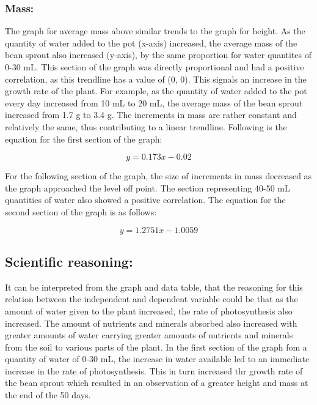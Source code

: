 \documentclass[11pt, a4]{article}
\begin{document}
			\subsubsection{Mass:}
				The graph for average mass above similar trends to the graph for height. As the quantity of water added to the pot (x-axis) increased, the average mass of the bean sprout also increased (y-axis), by the same proportion for water quantites of 0-30 mL. This section of the graph was directly proportional and had a positive correlation, as this trendline has a value of (0, 0). This signals an increase in the growth rate of the plant. For example, as the quantity of water added to the pot every day increased from 10 mL to 20 mL, the average mass of the bean sprout increased from 1.7 g to 3.4 g. The increments in mass are rather constant and relatively the same, thus contributing to a linear trendline. Following is the equation for the first section of the graph:
				
				\begin{equation}
					y = 0.173x - 0.02	
				\end{equation}
				
				For the following section of the graph, the size of increments in mass decreased as the graph approached the level off point. The section representing 40-50 mL quantities of water also showed a positive correlation. The equation for the second section of the graph is as follows:

				\begin{equation}
					y = 1.2751x - 1.0059
				\end{equation}

		\subsection{Scientific reasoning:}
			It can be interpreted from the graph and data table, that the reasoning for this relation between the independent and dependent variable could be that as the amount of water given to the plant increased, the rate of photosynthesis also increased. The amount of nutrients and minerals absorbed also increased with greater amounts of water carrying greater amounts of nutrients and minerals from the soil to various parts of the plant. In the first section of the graph fom a quantity of water of 0-30 mL, the increase in water available led to an immediate increase in the rate of photosynthesis. This in turn increased thr growth rate of the bean sprout which resulted in an observation of a greater height and mass at the end of the 50 days. 
\end{document}
